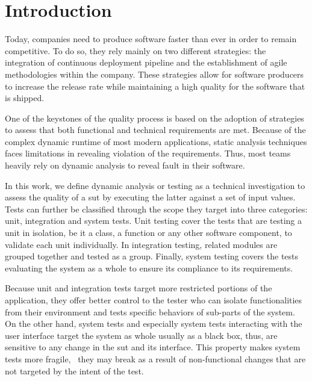 \chapter{Introduction}


Today, companies need to produce software faster than ever in order to remain competitive. To do so, they rely mainly on two different strategies: the integration of continuous deployment pipeline and the establishment of agile methodologies within the company. These strategies allow for software producers to increase the release rate while maintaining a high quality for the software that is shipped.

One of the keystones of the quality process is based on the adoption of strategies to assess that both functional and technical requirements are met. Because of the complex dynamic runtime of most modern applications, static analysis techniques faces limitations in revealing violation of the requirements. Thus, most teams heavily rely on dynamic analysis to reveal fault in their software. 

In this work, we define dynamic analysis or testing as a technical investigation to assess the quality of a \gls{sut} by executing the latter against a set of input values. Tests can further be classified through the scope they target into three categories: unit, integration and system tests. Unit testing cover the tests that are testing a unit in isolation, be it a class, a function or any other software component,  to validate each unit individually. In integration testing, related modules are grouped together and tested as a group. Finally, system testing covers the tests evaluating the system as a whole to ensure its compliance to its requirements.

Because unit and integration tests target more restricted portions of the application, they offer better control to the tester who can isolate functionalities from their environment and tests specific behaviors of sub-parts of the system. On the other hand, system tests and especially system tests interacting with the user interface target the system as whole usually as a black box, thus, are sensitive to any change in the \gls{sut} and its interface. This property makes system tests more fragile, \ie\ they may break as a result of non-functional changes that are not targeted by the intent of the test.

